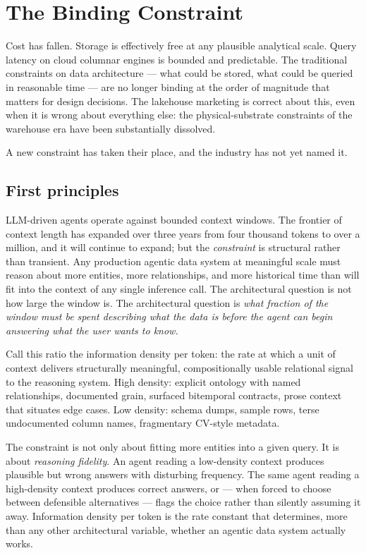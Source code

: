\documentclass[11pt,a4paper]{article}
\begin{document}
\section{The Binding Constraint}
\label{sec:binding}

Cost has fallen. Storage is effectively free at any plausible analytical scale. Query latency on cloud columnar engines is bounded and predictable. The traditional constraints on data architecture --- what could be stored, what could be queried in reasonable time --- are no longer binding at the order of magnitude that matters for design decisions. The lakehouse marketing is correct about this, even when it is wrong about everything else: the physical-substrate constraints of the warehouse era have been substantially dissolved.

A new constraint has taken their place, and the industry has not yet named it.

\subsection{First principles}

LLM-driven agents operate against bounded context windows. The frontier of context length has expanded over three years from four thousand tokens to over a million, and it will continue to expand; but the \emph{constraint} is structural rather than transient. Any production agentic data system at meaningful scale must reason about more entities, more relationships, and more historical time than will fit into the context of any single inference call. The architectural question is not how large the window is. The architectural question is \emph{what fraction of the window must be spent describing what the data is before the agent can begin answering what the user wants to know.}

Call this ratio the information density per token: the rate at which a unit of context delivers structurally meaningful, compositionally usable relational signal to the reasoning system. High density: explicit ontology with named relationships, documented grain, surfaced bitemporal contracts, prose context that situates edge cases. Low density: schema dumps, sample rows, terse undocumented column names, fragmentary CV-style metadata.

The constraint is not only about fitting more entities into a given query. It is about \emph{reasoning fidelity}. An agent reading a low-density context produces plausible but wrong answers with disturbing frequency. The same agent reading a high-density context produces correct answers, or --- when forced to choose between defensible alternatives --- flags the choice rather than silently assuming it away. Information density per token is the rate constant that determines, more than any other architectural variable, whether an agentic data system actually works.
\end{document}
